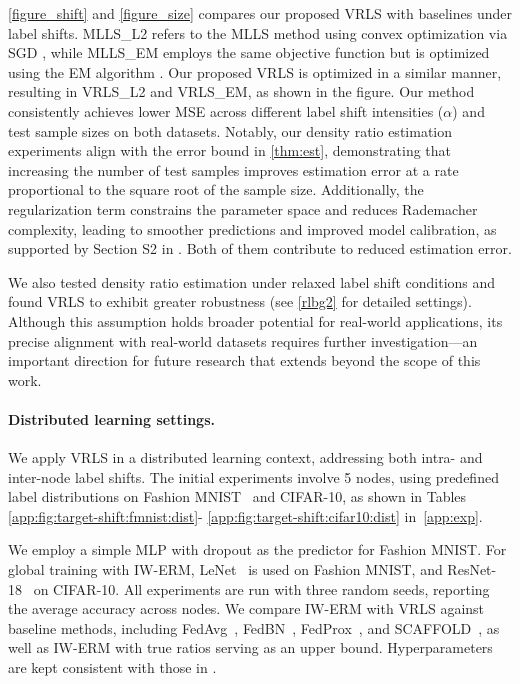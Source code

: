 \cref{figure_shift} and \cref{figure_size} compares our proposed VRLS with baselines \citep{mlls, bbse_2002} under label shifts. MLLS\_L2 refers to the MLLS method using convex optimization via SGD \citep{mlls}, while MLLS\_EM employs the same objective function but is optimized using the EM algorithm \citep{bbse_2002}. 
Our proposed VRLS is optimized in a similar manner, resulting in VRLS\_L2 and VRLS\_EM, as shown in the figure. 
Our method consistently achieves lower MSE across different label shift intensities ($\alpha$) and test sample sizes on both datasets.
Notably, our density ratio estimation experiments align with the error bound in \cref{thm:est}, demonstrating that increasing the number of test samples improves estimation error at a rate proportional to the square root of the sample size. Additionally, the regularization term constrains the parameter space and reduces Rademacher complexity, leading to smoother predictions and improved model calibration, as supported by Section S2 in \citep{calibration_modern}. Both of them contribute to reduced estimation error. 

We also tested density ratio estimation under relaxed label shift conditions and found VRLS to exhibit greater robustness (see \cref{rlbg2} for detailed settings). Although this assumption holds broader potential for real-world applications, its precise alignment with real-world datasets requires further investigation—an important direction for future research that extends beyond the scope of this work.

\paragraph{Distributed learning settings.} We apply VRLS in a distributed learning context, addressing both intra- and inter-node label shifts. The initial experiments involve 5 nodes, using predefined label distributions on Fashion MNIST~\citep{f-mnist} and CIFAR-10, as shown in Tables \ref{app:fig:target-shift:fmnist:dist}- \ref{app:fig:target-shift:cifar10:dist} in~\cref{app:exp}. 

We employ a simple MLP with dropout as the predictor for Fashion MNIST. For global training with IW-ERM, LeNet~\citep{MNIST} is used on Fashion MNIST, and ResNet-18~\citep{ali2023federated} on CIFAR-10. All experiments are run with three random seeds, reporting the average accuracy across nodes. We compare IW-ERM with VRLS against baseline methods, including FedAvg~\citep{FedAvg}, FedBN~\citep{fedbn}, FedProx~\citep{fedprox}, and SCAFFOLD~\citep{SCAFFOLD}, as well as IW-ERM with true ratios serving as an upper bound. Hyperparameters are kept consistent with those in \citep{FedAvg, fedbn, ali2023federated}.

